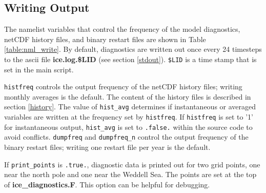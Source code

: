\subsection{Writing Output}

The namelist variables that control the frequency of the model diagnostics, netCDF
history files, and binary restart files are shown in Table \ref{table:nml_write}.
By default, diagnostics are written out once every 24 timesteps to the ascii file
{\bf ice.log.\$LID} (see section \ref{stdout}). {\tt \$LID} is a time stamp that is
set in the main script.   

{\tt histfreq} controls the output frequency of the 
netCDF history files; writing monthly averages is the default.  The content of the
history files is described in section \ref{history}.  The value of {\tt hist\_avg}
determines if instantaneous or averaged variables are written at the frequency set
by {\tt histfreq}.  If {\tt histfreq} is set to '1' for instantaneous output,
{\tt hist\_avg} is set to {\tt .false.} within the source code to avoid conflicts.
{\tt dumpfreq} and {\tt dumpfreq\_n} control the output frequency of the binary
restart files; writing one restart file per year is the default.

If {\tt print\_points} is {\tt .true.}, diagnostic data is printed out for two
grid points, one near the north pole and one near the Weddell Sea.  The points
are set at the top of {\bf ice\_diagnostics.F}.  This option can be helpful for
debugging.

